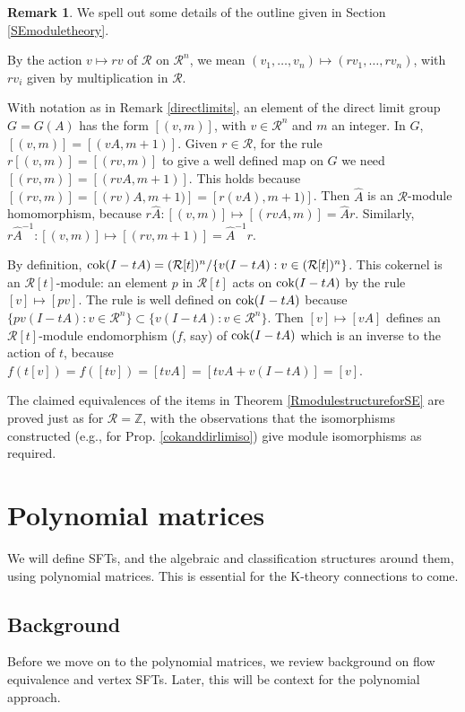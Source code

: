 \documentclass{amsart}
\theoremstyle{definition}
\newtheorem{rem}[equation]{Remark}
\theoremstyle{definition}
\newcommand{\Z}{\mathbb Z}
\newcommand{\cok}{\textnormal{cok}}
\numberwithin{equation}{subsection}
\begin{document}
\begin{rem}\label{SEmoduletheorydetails}
We spell out some details of the outline given in
Section  \ref{SEmoduletheory}.

By the action $v\mapsto rv$ of $\mathcal R$ on $\mathcal R^n$,
we mean $(v_1, \dots , v_n)\mapsto (rv_1, \dots , rv_n)$,
with $rv_i$ given by multiplication in $\mathcal R$.

With notation as in Remark \ref{directlimits}, an element of
the direct limit group $G=G(A)$ has the form $[(v,m)]$,
with $v\in \mathcal R^n$ and $m$ an integer.
In $G$, $[(v,m)]=[(vA,m+1)]$. Given $r\in \mathcal R$,
for the rule $r[(v,m)]= [(rv,m)]$ to give a well defined
map on $G$ we need   $[(rv,m)]=[(rvA,m+1)]$.
This holds because $[(rv,m)]=[(rv)A,m+1)]=[r(vA),m+1)]$.
Then  $\widehat A$ is an $\mathcal R$-module homomorphism,
because
$r\widehat A: [(v,m)]\mapsto [(rvA,m)] =  \widehat Ar$.
Similarly,
$r\widehat A^{-1} : [(v,m)]\mapsto [(rv,m+1)] =\widehat A^{-1}r$.

By definition,
$\cok(I-tA)= (\mathcal R[t])^n/\{ v(I-tA): v\in (\mathcal R[t])^n\}$.
This cokernel  is an $\mathcal R[t]$-module:
an element  $p$ in $\mathcal R[t]$ acts on $\cok(I-tA)$ by the
  rule $[v] \mapsto [pv]$. The rule
is well defined on  $\cok(I-tA)$ because
 $\{ pv(I-tA): v\in \mathcal R^n\}
  \subset \{ v(I-tA): v\in \mathcal R^n\}$.
     Then  $[v]\mapsto [vA]$  defines
    an $\mathcal R[t]$-module endomorphism ($f$, say) of
    $\cok(I-tA)$ which is an inverse to the action of $t$,
    because $f(t[v])= f([tv])= [tvA]
    =[tvA + v(I-tA)] = [v]$.
\end{rem}

The claimed equivalences of the items in
Theorem \ref{RmodulestructureforSE}
are proved just as for $\mathcal R = \Z$,
with the observations that the  isomorphisms constructed
(e.g., for Prop. \ref{cokanddirlimiso})
give module isomorphisms as required.


\section{Polynomial matrices}\label{sec:polynomial}


We will define SFTs, and the algebraic and classification structures
around them, using polynomial matrices. This is essential for
the K-theory connections to come.
\subsection{Background}\label{subsec:backgroundstuff}
Before we move on to the polynomial matrices,
we review background on  flow equivalence and vertex SFTs. Later,
this  will be  context  for
the polynomial approach.
\end{document}

